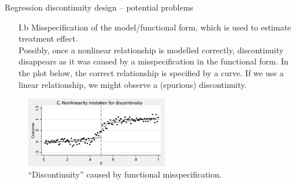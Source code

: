 \documentclass{beamer}
\begin{document}
\begin{frame}{Regression discontinuity design -- potential problems}
\begin{itemize}
    \item[I.b] Misspecification of the model/functional form, which is used to estimate treatment effect.\\ 
    \bigskip
    Possibly, once a nonlinear relationship is modelled correctly, discontinuity disappears as it was caused by a misspecification in the functional form. In the plot below, the correct relationship is specified by a curve. If we use a linear relationship, we might observe a (spurious) discontinuity.
\end{itemize}
\begin{figure}
    \centering
    \includegraphics[width=0.55\textwidth]{./IMG/RDD3.png}
    \caption*{``Discontinuity'' caused by functional misspecification.} \label{fig:my_label2}
\end{figure}    
\end{frame}
\end{document}
